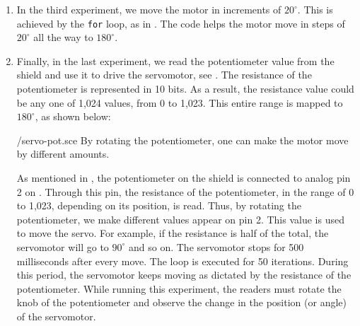 \begin{enumerate}
        

  \item In the third experiment, we move the motor in increments of
        $20^\circ$.  This is achieved by the {\tt for} loop, as in
        . The code helps the motor move in steps of $20^\circ$ all
        the way to $180^\circ$.  
        
  \item Finally, in the last experiment, we read the potentiometer value
        from the shield and use it to drive the servomotor, see
        .  The resistance of the potentiometer is
        represented in 10 bits.  As a result, the resistance value could be
        any one of 1,024 values, from 0 to 1,023.  This entire range is
        mapped to $180^\circ$, as shown below:
        
        {\LocSERscicode/servo-pot.sce}
        By rotating the potentiometer, one can make
        the motor move by different amounts.
        
        As mentioned in , the potentiometer on the shield is connected 
        to analog pin 2 on \arduino. Through this pin, the resistance of the potentiometer, in the range of 0 to 1,023,
        depending on its position, is read.  Thus, by rotating the
        potentiometer, we make different values appear on pin 2.  This value
        is used to move the servo.  For example, if the resistance is half
        of the total, the servomotor will go to $90^\circ$ and so on.  The
        servomotor stops for 500 milliseconds after every move.  The loop is
        executed for 50 iterations. During this period, the servomotor keeps moving as dictated by the
        resistance of the potentiometer. While running this experiment, the readers 
        must rotate the knob of the potentiometer and observe 
        the change in the position (or angle) of the servomotor.   
        
        
        

\end{enumerate}
